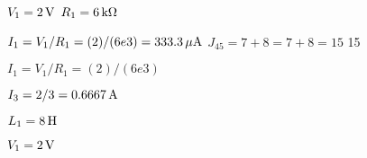 \vspace{1ex}

\vspace{1ex}






\mbox{$V_{1}=\mbox{$2 \,\mathrm{ V}$}$} \mbox{$R_{1}=\mbox{$6 \,\mathrm{k \Omega}$}$}

\mbox{$I_{1} = V_{1}/R_{1}  =  (2)/(6e3) = \mbox{$333.3 \,\mathrm{\mu A}$}$} \mbox{$J_{45}=7+8  = 7+8 = 15$} 15

\mbox{$I_{1} = V_{1}/R_{1}  =  (2)/(6e3)$}

\mbox{$I_{3}=2/3  = \mbox{$0.6667 \,\mathrm{ A}$}$}

\mbox{$L_{1}=\mbox{$8 \,\mathrm{ H}$}$}

\vspace{1ex}

\vspace{1ex}

\mbox{$V_{1}=\mbox{$2 \,\mathrm{ V}$}$}
